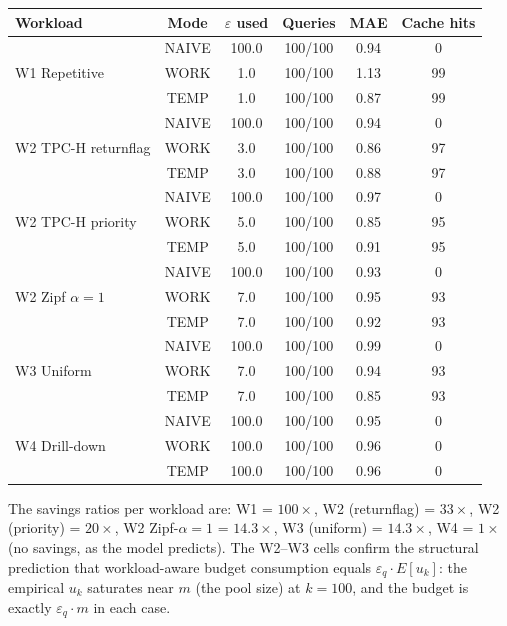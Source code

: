 \documentclass[sigconf,nonacm]{acmart}
\newcommand{\eps}{\varepsilon}
\begin{document}
\begin{center}
\footnotesize
\begin{tabular}{l|c|cccc}
\toprule
Workload & Mode & $\eps$ used & Queries & MAE & Cache hits \\
\midrule
\multirow{3}{*}{W1 Repetitive}      & NAIVE & 100.0 & 100/100 & 0.94 & 0 \\
                                     & WORK  & 1.0   & 100/100 & 1.13 & 99 \\
                                     & TEMP  & 1.0   & 100/100 & 0.87 & 99 \\
\midrule
\multirow{3}{*}{W2 TPC-H returnflag} & NAIVE & 100.0 & 100/100 & 0.94 & 0 \\
                                     & WORK  & 3.0   & 100/100 & 0.86 & 97 \\
                                     & TEMP  & 3.0   & 100/100 & 0.88 & 97 \\
\midrule
\multirow{3}{*}{W2 TPC-H priority}   & NAIVE & 100.0 & 100/100 & 0.97 & 0 \\
                                     & WORK  & 5.0   & 100/100 & 0.85 & 95 \\
                                     & TEMP  & 5.0   & 100/100 & 0.91 & 95 \\
\midrule
\multirow{3}{*}{W2 Zipf $\alpha=1$}  & NAIVE & 100.0 & 100/100 & 0.93 & 0 \\
                                     & WORK  & 7.0   & 100/100 & 0.95 & 93 \\
                                     & TEMP  & 7.0   & 100/100 & 0.92 & 93 \\
\midrule
\multirow{3}{*}{W3 Uniform}          & NAIVE & 100.0 & 100/100 & 0.99 & 0 \\
                                     & WORK  & 7.0   & 100/100 & 0.94 & 93 \\
                                     & TEMP  & 7.0   & 100/100 & 0.85 & 93 \\
\midrule
\multirow{3}{*}{W4 Drill-down}       & NAIVE & 100.0 & 100/100 & 0.95 & 0 \\
                                     & WORK  & 100.0 & 100/100 & 0.96 & 0 \\
                                     & TEMP  & 100.0 & 100/100 & 0.96 & 0 \\
\bottomrule
\end{tabular}
\end{center}

\noindent The savings ratios per workload are: W1 = $100\times$, W2 (returnflag) = $33\times$, W2 (priority) = $20\times$, W2 Zipf-$\alpha{=}1$ = $14.3\times$, W3 (uniform) = $14.3\times$, W4 = $1\times$ (no savings, as the model predicts). The W2--W3 cells confirm the structural prediction that workload-aware budget consumption equals $\eps_q \cdot E[u_k]$: the empirical $u_k$ saturates near $m$ (the pool size) at $k=100$, and the budget is exactly $\eps_q \cdot m$ in each case.
\end{document}
